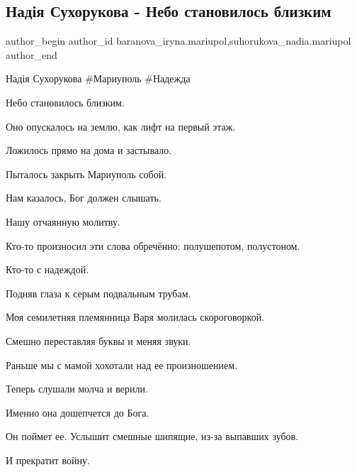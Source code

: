 
 
 
 
 

\subsection{Надія Сухорукова - Небо становилось близким}
\label{sec:23_10_2022.fb.baranova_iryna.mariupol.1.nad_ya_sukhorukova__}
 
\ifcmt
 author_begin
   author_id baranova_iryna.mariupol,suhorukova_nadia.mariupol
 author_end
\fi

Надія Сухорукова  \#Мариуполь \#Надежда

Небо становилось близким. 

Оно опускалось на землю,  как лифт на первый этаж. 

Ложилось прямо на дома и застывало.  

Пыталось закрыть Мариуполь собой. 

Нам казалось, Бог должен слышать. 

Нашу  отчаянную молитву. 

Кто-то  произносил эти слова обречённо:  полушепотом, полустоном. 

Кто-то  с надеждой.  

Подняв  глаза к серым подвальным трубам. 

Моя  семилетняя   племянница Варя молилась скороговоркой. 

Смешно переставляя буквы и меняя звуки. 

Раньше мы с мамой хохотали над ее произношением. 

Теперь слушали молча  и верили. 

Именно  она дошепчется до Бога. 

Он поймет  ее. Услышит смешные шипящие, из-за выпавших зубов. 

И прекратит войну. 

